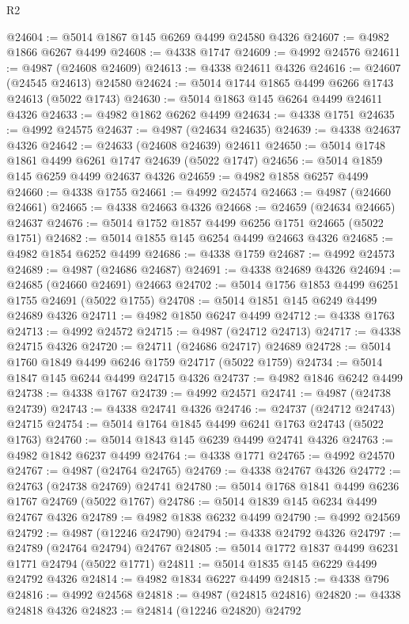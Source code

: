 \begin{lexlean}{R2}
\begin{coremodule}
@24604 := @5014 @1867 @145 @6269 @4499 @24580 @4326
@24607 := @4982 @1866 @6267 @4499
@24608 := @4338 @1747
@24609 := @4992 @24576
@24611 := @4987 (@24608 @24609)
@24613 := @4338 @24611 @4326
@24616 := @24607 (@24545 @24613) @24580
@24624 := @5014 @1744 @1865 @4499 @6266 @1743 @24613 (@5022 @1743)
@24630 := @5014 @1863 @145 @6264 @4499 @24611 @4326
@24633 := @4982 @1862 @6262 @4499
@24634 := @4338 @1751
@24635 := @4992 @24575
@24637 := @4987 (@24634 @24635)
@24639 := @4338 @24637 @4326
@24642 := @24633 (@24608 @24639) @24611
@24650 := @5014 @1748 @1861 @4499 @6261 @1747 @24639 (@5022 @1747)
@24656 := @5014 @1859 @145 @6259 @4499 @24637 @4326
@24659 := @4982 @1858 @6257 @4499
@24660 := @4338 @1755
@24661 := @4992 @24574
@24663 := @4987 (@24660 @24661)
@24665 := @4338 @24663 @4326
@24668 := @24659 (@24634 @24665) @24637
@24676 := @5014 @1752 @1857 @4499 @6256 @1751 @24665 (@5022 @1751)
@24682 := @5014 @1855 @145 @6254 @4499 @24663 @4326
@24685 := @4982 @1854 @6252 @4499
@24686 := @4338 @1759
@24687 := @4992 @24573
@24689 := @4987 (@24686 @24687)
@24691 := @4338 @24689 @4326
@24694 := @24685 (@24660 @24691) @24663
@24702 := @5014 @1756 @1853 @4499 @6251 @1755 @24691 (@5022 @1755)
@24708 := @5014 @1851 @145 @6249 @4499 @24689 @4326
@24711 := @4982 @1850 @6247 @4499
@24712 := @4338 @1763
@24713 := @4992 @24572
@24715 := @4987 (@24712 @24713)
@24717 := @4338 @24715 @4326
@24720 := @24711 (@24686 @24717) @24689
@24728 := @5014 @1760 @1849 @4499 @6246 @1759 @24717 (@5022 @1759)
@24734 := @5014 @1847 @145 @6244 @4499 @24715 @4326
@24737 := @4982 @1846 @6242 @4499
@24738 := @4338 @1767
@24739 := @4992 @24571
@24741 := @4987 (@24738 @24739)
@24743 := @4338 @24741 @4326
@24746 := @24737 (@24712 @24743) @24715
@24754 := @5014 @1764 @1845 @4499 @6241 @1763 @24743 (@5022 @1763)
@24760 := @5014 @1843 @145 @6239 @4499 @24741 @4326
@24763 := @4982 @1842 @6237 @4499
@24764 := @4338 @1771
@24765 := @4992 @24570
@24767 := @4987 (@24764 @24765)
@24769 := @4338 @24767 @4326
@24772 := @24763 (@24738 @24769) @24741
@24780 := @5014 @1768 @1841 @4499 @6236 @1767 @24769 (@5022 @1767)
@24786 := @5014 @1839 @145 @6234 @4499 @24767 @4326
@24789 := @4982 @1838 @6232 @4499
@24790 := @4992 @24569
@24792 := @4987 (@12246 @24790)
@24794 := @4338 @24792 @4326
@24797 := @24789 (@24764 @24794) @24767
@24805 := @5014 @1772 @1837 @4499 @6231 @1771 @24794 (@5022 @1771)
@24811 := @5014 @1835 @145 @6229 @4499 @24792 @4326
@24814 := @4982 @1834 @6227 @4499
@24815 := @4338 @796
@24816 := @4992 @24568
@24818 := @4987 (@24815 @24816)
@24820 := @4338 @24818 @4326
@24823 := @24814 (@12246 @24820) @24792

\end{coremodule}
\end{lexlean}
